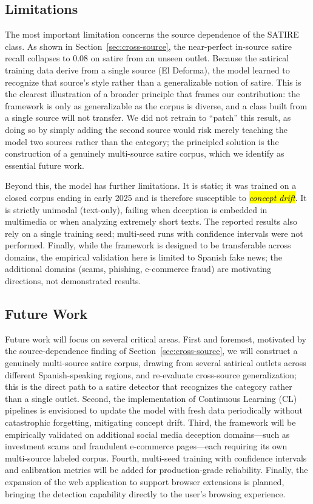 \documentclass[informatics,article,accept,pdftex,moreauthors]{Definitions/mdpi}
\begin{document}
\subsection{Limitations}\label{sec:limitations}
The most important limitation concerns the source dependence of the SATIRE class. As shown in Section~\ref{sec:cross-source}, the near-perfect in-source satire recall collapses to 0.08 on satire from an unseen outlet. Because the satirical training data derive from a single source (El Deforma), the model learned to recognize that source's style rather than a generalizable notion of satire. This is the clearest illustration of a broader principle that frames our contribution: the framework is only as generalizable as the corpus is diverse, and a class built from a single source will not transfer. We did not retrain to ``patch'' this result, as doing so by simply adding the second source would risk merely teaching the model two sources rather than the category; the principled solution is the construction of a genuinely multi-source satire corpus, which we identify as essential future work.

Beyond this, the model has further limitations. It is static; it was trained on a closed corpus ending in early 2025 and is therefore susceptible to \textit{\hl{concept drift}}. It is strictly unimodal (text-only), failing when deception is embedded in multimedia or when analyzing extremely short texts. The reported results also rely on a single training seed; multi-seed runs with confidence intervals were not performed. Finally, while the framework is designed to be transferable across domains, the empirical validation here is limited to Spanish fake news; the additional domains (scams, phishing, e-commerce fraud) are motivating directions, not demonstrated results.

\subsection{Future Work}
Future work will focus on several critical areas. First and foremost, motivated by the source-dependence finding of Section~\ref{sec:cross-source}, we will construct a genuinely multi-source satire corpus, drawing from several satirical outlets across different Spanish-speaking regions, and re-evaluate cross-source generalization; this is the direct path to a satire detector that recognizes the category rather than a single outlet. Second, the implementation of Continuous Learning (CL) pipelines is envisioned to update the model with fresh data periodically without catastrophic forgetting, mitigating concept drift. Third, the framework will be empirically validated on additional social media deception domains—such as investment scams and fraudulent e-commerce pages—each requiring its own multi-source labeled corpus. Fourth, multi-seed training with confidence intervals and calibration metrics will be added for production-grade reliability. Finally, the expansion of the web application to support browser extensions is planned, bringing the detection capability directly to the user's browsing experience.
\end{document}
